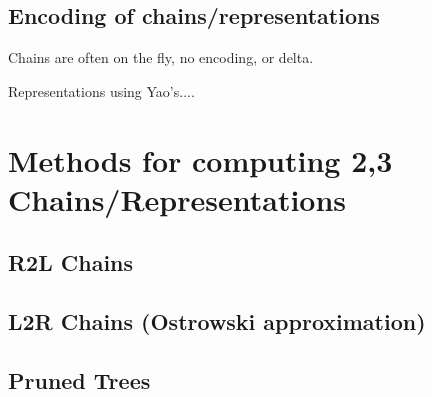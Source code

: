 \documentclass{ucalgthes1}
\theoremstyle{plain}
\theoremstyle{definition}
\begin{document}
\bigbreak
\subsection{Encoding of chains/representations}

Chains are often on the fly, no encoding, or delta.

Representations using Yao's....


\pagebreak
\bigbreak
\section{Methods for computing 2,3 Chains/Representations}\label{section:dbnsMethods}

\bigbreak
\subsection{R2L Chains}

\bigbreak
\subsection{L2R Chains (Ostrowski approximation)}

\bigbreak
\subsection{Pruned Trees}
\end{document}
